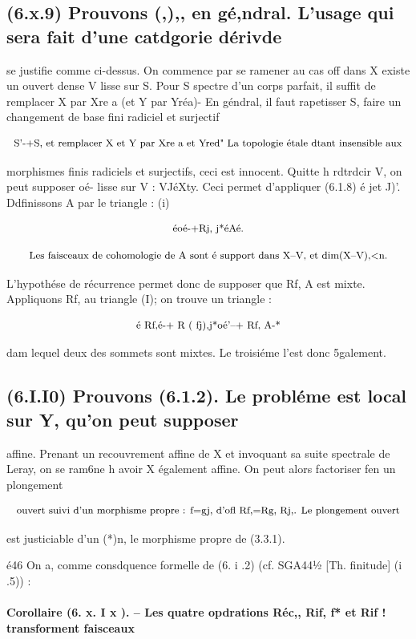 \documentclass[11pt]{article}
\theoremstyle{remark}
\begin{document}
\subsection*{(6.x.9) Prouvons (,),, en gé,ndral. L'usage qui sera fait d'une catdgorie dérivde}

se justifie comme ci-dessus. On commence par se ramener au cas off dans X existe un ouvert dense V lisse sur S. Pour S spectre d'un corps parfait, il suffit de remplacer X par Xre a (et Y par Yréa)- En géndral, il faut rapetisser S, faire un changement de base fini radiciel et surjectif

\[\text{\small S'-+S, et remplacer X et Y par Xre a et Yred" La topologie étale dtant insensible aux}\]

morphismes finis radiciels et surjectifs, ceci est innocent. Quitte h rdtrdcir V, on peut supposer oé- lisse sur V : VJéXty. Ceci permet d'appliquer (6.1.8) é jet J)'. Ddfinissons A par le triangle : (i)

\[\text{\small éoé-+Rj, j*éAé.}\]

\[\text{\small Les faisceaux de cohomologie de A sont é support dans X--V, et dim(X--V),<n.}\]

L'hypothése de récurrence permet donc de supposer que Rf, A est mixte. Appliquons Rf, au triangle (I); on trouve un triangle :

\[\text{\small é Rf,é-+ R ( fj),j*oé'--+ Rf, A-*}\]

dam lequel deux des sommets sont mixtes. Le troisiéme l'est donc 5galement.

\subsection*{(6.I.I0) Prouvons (6.1.2). Le probléme est local sur Y, qu'on peut supposer}

affine. Prenant un recouvrement affine de X et invoquant sa suite spectrale de Leray, on se ram6ne h avoir X également affine. On peut alors factoriser fen un plongement

\[\text{\small ouvert suivi d'un morphisme propre : f=gj, d'ofl Rf,=Rg, Rj,. Le plongement ouvert}\]

est justiciable d'un (*)n, le morphisme propre de (3.3.1).

é46 On a, comme consdquence formelle de (6. i .2) (cf. SGA44½ [Th. finitude] (i .5)) :

\paragraph{Corollaire (6. x. I x ). -- Les quatre opdrations Réc,, Rif, f* et Rif ! transforment faisceaux}
\end{document}
